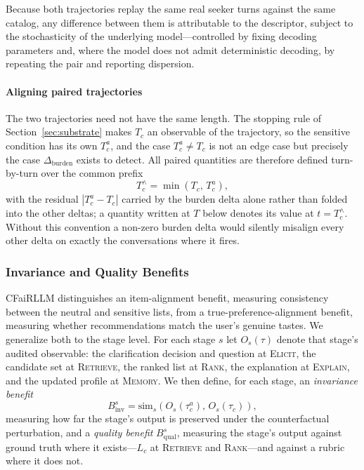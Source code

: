 \documentclass[manuscript,screen,review]{acmart}
\newcommand{\Dburden}{\Delta_{\mathrm{burden}}}
\newcommand{\Binv}{B^{s}_{\mathrm{inv}}}
\newcommand{\Bqual}{B^{s}_{\mathrm{qual}}}
\newcommand{\stage}[1]{\textsc{#1}}
\begin{document}
Because both trajectories replay the same real seeker turns against the same
catalog, any difference between them is attributable to the descriptor, subject
to the stochasticity of the underlying model---controlled by fixing decoding
parameters and, where the model does not admit deterministic decoding, by
repeating the pair and reporting dispersion.

\paragraph{Aligning paired trajectories}
The two trajectories need not have the same length. The stopping rule of
Section~\ref{sec:substrate} makes $T_c$ an observable of the trajectory, so the
sensitive condition has its own $T^{a}_c$, and the case $T^{a}_c \neq T_c$ is not
an edge case but precisely the case $\Dburden$ exists to detect. All paired
quantities are therefore defined turn-by-turn over the common prefix
\begin{equation}
  T^{\wedge}_c = \min\left(T_c,\, T^{a}_c\right),
  \label{eq:align}
\end{equation}
with the residual $|T^{a}_c - T_c|$ carried by the burden delta alone rather than
folded into the other deltas; a quantity written at $T$ below denotes its value at
$t = T^{\wedge}_c$. Without this convention a non-zero burden delta would silently
misalign every other delta on exactly the conversations where it fires.





\subsubsection{Invariance and Quality Benefits}
\label{sec:benefits}

CFaiRLLM distinguishes an item-alignment benefit, measuring consistency between
the neutral and sensitive lists, from a true-preference-alignment benefit,
measuring whether recommendations match the user's genuine tastes. We generalize
both to the stage level. For each stage $s$ let $O_s(\tau)$ denote that stage's
audited observable: the clarification decision and question at \stage{Elicit}, the
candidate set at \stage{Retrieve}, the ranked list at \stage{Rank}, the
explanation at \stage{Explain}, and the updated profile at \stage{Memory}. We
then define, for each stage, an \emph{invariance benefit}
\begin{equation}
  \Binv = \mathrm{sim}_s\!\left(O_s(\tau^{a}_c),\, O_s(\tau_c)\right),
  \label{eq:binv}
\end{equation}
measuring how far the stage's output is preserved under the counterfactual
perturbation, and a \emph{quality benefit} $\Bqual$, measuring the stage's output
against ground truth where it exists---$L_c$ at \stage{Retrieve} and
\stage{Rank}---and against a rubric where it does not.
\end{document}
